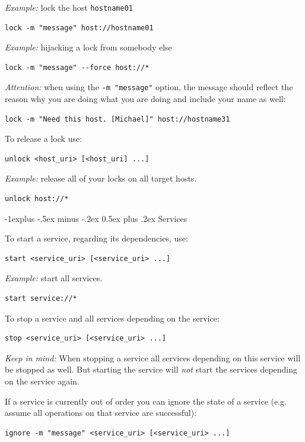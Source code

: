 \documentclass[10pt,landscape]{article}
\makeatletter
\renewcommand{\subsection}{\@startsection{subsection}{2}{0mm}%
                                {-1explus -.5ex minus -.2ex}%
                                {0.5ex plus .2ex}%
                                {\normalfont\normalsize\bfseries}}
\makeatother
\begin{document}
\begin{multicols}{3}
\emph{Example:} lock the host \verb+hostname01+
\begin{lstlisting}
lock -m "message" host://hostname01
\end{lstlisting}

\emph{Example:} hijacking a lock from somebody else
\begin{lstlisting}
lock -m "message" --force host://*
\end{lstlisting}

\emph{Attention:} when using the \verb+-m "message"+ option, the message
should reflect the reason why you are doing what you are doing and
include your name as well:
\begin{lstlisting}
lock -m "Need this host. [Michael]" host://hostname31
\end{lstlisting}

To release a lock use:
\begin{lstlisting}
unlock <host_uri> [<host_uri] ...]
\end{lstlisting}

\emph{Example:} release all of your locks on all target hosts.
\begin{lstlisting}
unlock host://*
\end{lstlisting}



\vfill\columnbreak
\subsection{Services}

To start a service, regarding its dependencies, use:
\begin{lstlisting}
start <service_uri> [<service_uri> ...]
\end{lstlisting}

\emph{Example:} start all services.
\begin{lstlisting}
start service://*
\end{lstlisting}

To stop a service and all services depending on the service:
\begin{lstlisting}
stop <service_uri> [<service_uri> ...]
\end{lstlisting}

\emph{Keep in mind:} When stopping a service all services depending on this service will be
stopped as well. But starting the service will \emph{not} start the services
depending on the service again.


If a service is currently out of order you can ignore the state of a service
(e.g. assume all operations on that service are successful):
\begin{lstlisting}
ignore -m "message" <service_uri> [<service_uri> ...]
\end{lstlisting}


\end{multicols}
\end{document}
